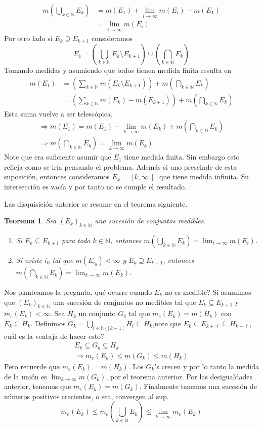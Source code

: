 \documentclass[12pt]{article}
\theoremstyle{plain}
\newtheorem{Th}{Teorema}[subsection]   %
\theoremstyle{definition}
\theoremstyle{remark}
\numberwithin{equation}{section}
\newcommand{\bN}{\mathbb{N}}        %
\renewcommand{\leq}{\leqslant}      %
\renewcommand{\:}{\colon}           %
\newcommand{\bonj}[1]{\left\lbrack#1\right\rbrack}
\newcommand{\lbonj}[1]{\left\lbrack#1\right\lbrack}
\begin{document}
\begin{multicols}{2}
\begin{align*}
   m(\bigcup_{k\in\bN}E_k) &=m(E_1)+\lim_{i\to\infty}m(E_i)-m(E_1)\\
   &=\lim_{i\to\infty}m(E_i)
\end{align*}
Por otro lado si $E_k\supseteq E_{k+1}$ consideramos
$$E_1=\left(\bigcup_{k\in\bN}E_k\setminus E_{k+1}\right)\cup\left(\bigcap_{k\in\bN}E_k\right)$$
Tomando medidas y asumiendo que todos tienen medida finita resulta en
\begin{align*}
  m(E_1) &=\left(\sum_{k\in\bN}m(E_k\setminus E_{k+1})\right)+m\left(\bigcap_{k\in\bN}E_k\right)\\
  &=\left(\sum_{k\in\bN}m(E_k)-m(E_{k+1})\right)+m\left(\bigcap_{k\in\bN}E_k\right)
\end{align*}
Esta suma vuelve a ser telescópica.
\begin{gather*}
  \Rightarrow m(E_1)=m(E_1)-\lim_{k\to\infty}m(E_k)+m\left(\bigcap_{k\in\bN}E_k\right)\\
  \Rightarrow m\left(\bigcap_{k\in\bN}E_k\right)=\lim_{k\to\infty}m(E_k)
\end{gather*}
Note que era suficiente asumir que $E_1$ tiene medida finita. Sin embargo esto refleja como se iría pensando el problema. Además si uno prescinde de esta suposición, entonces consideramos $E_k=\lbonj{k,\infty}$ que tiene medida infinita. Su intersección es vacía y por tanto no se cumple el resultado.\par
Las disquisición anterior se resume en el teorema siguiente.

\begin{Th}\label{thm:mCadenasAscDec}
  Sea $(E_k)_{k\in\bN}$ una sucesión de conjuntos medibles.
  \begin{enumerate}
    \item Si $E_k\subseteq E_{k+1}$ para todo $k\in\bN$, entonces $m(\bigcup_{k\in\bN}E_k)=\lim_{i\to\infty}m(E_i)$.
    \item Si existe $i_0$ tal que $m(E_{i_0})<\infty$ y $E_k\supseteq E_{k+1}$, entonces $m\left(\bigcap_{k\in\bN}E_k\right)=\lim_{k\to\infty}m(E_k)$.
  \end{enumerate}
\end{Th}
Nos planteamos la pregunta, qué ocurre cuando $E_k$ no es medible? Si asumimos que $(E_k)_{k\in\bN}$ una sucesión de conjuntos no medibles tal que $E_k\subseteq E_{k+1}$ y $m_e(E_k)<\infty$. Sea $H_k$ un conjunto $G_\delta$ tal que $m_e(E_k)=m(H_k)$ con $E_k\subseteq H_k$. Definimos $G_k=\bigcup_{i\in\bN\setminus\bonj{k-1}}H_i\subseteq H_k$,note que $E_k\subseteq E_{k+\ell}\subseteq H_{k+\ell}$, cuál es la ventaja de hacer esto?
\begin{gather*}
  E_k\subseteq G_k \subseteq H_k\\
  \Rightarrow m_e(E_k)\leq m(G_k)\leq m(H_k)
\end{gather*}
Pero recuerde que $m_e(E_k)=m(H_k)$. Los $G_k$'s crecen y por lo tanto la medida de la unión es $\lim_{k\to\infty}m(G_k)$, por el teorema anterior. Por las desigualdades anterior, tenemos que $m_e(E_k)=m(G_k)$. Finalmente tenemos una sucesión de números positivos crecientes, o sea, convergen al sup.
$$m_e(E_k)\leq m_e\left(\bigcup_{k\in\bN}E_k\right)\leq \lim_{k\to\infty}m_e(E_k)$$


\end{multicols}
\end{document}
